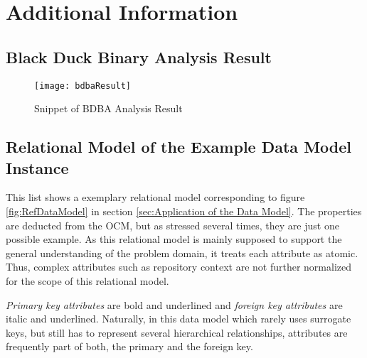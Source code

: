 
\appendix

\chapter{Additional Information} \label{apx:AdditionalFigures}
\section{Black Duck Binary Analysis Result}
\begin{figure}[H]
	\centering
	\texttt{[image: bdbaResult]}
	\caption[Snippet of BDBA Analysis Result]{Snippet of BDBA Analysis Result }
	\label{fig:bdbaResult}
\end{figure}

\section{Relational Model of the Example Data Model Instance} \label{apx:Relational Model of the Example Data Model Instance}
This list shows a exemplary relational model corresponding to figure \ref{fig:RefDataModel} in section \ref{sec:Application of the Data Model}. The properties are deducted from the OCM, but as stressed several times, they are just one possible example. As this relational model is mainly supposed to support the general understanding of the problem domain, it treats each attribute as atomic. Thus, complex attributes such as repository context are not further normalized for the scope of this relational model.\par
\textit{Primary key attributes} are bold and underlined and \textit{foreign key attributes} are italic and underlined. Naturally, in this data model which rarely uses surrogate keys, but still has to represent several hierarchical relationships, attributes are frequently part of both, the primary and the foreign key.

